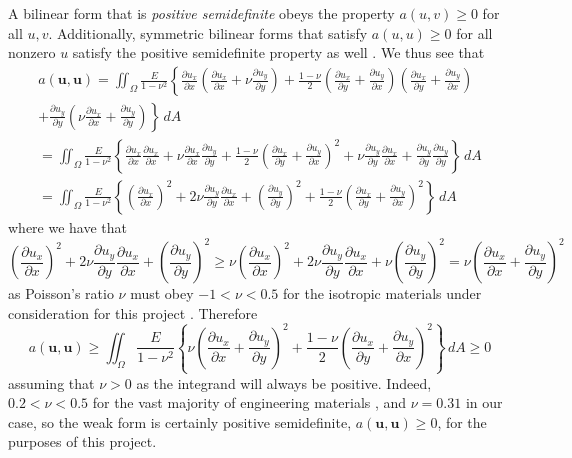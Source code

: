 \documentclass[11pt]{article}
\newcommand\p[2]{\frac{\partial #1}{\partial #2}}
\begin{document}
A bilinear form that is \emph{positive semidefinite} obeys the property $a(u,v) \ge 0$ for all $u,v$. Additionally, symmetric bilinear forms that satisfy $a(u,u) \ge 0$ for all nonzero $u$ satisfy the positive semidefinite property as well \cite{mathworld}. We thus see that
\begin{multline}
  a(\bm{u,u}) =
  \iint_\Omega \frac{E}{1-\nu^2} \left\{
    \p{u_x}{x} \left( \p{u_x}{x} + \nu\p{u_y}{y} \right)
      + \frac{1-\nu}{2} \left( \p{u_x}{y} + \p{u_y}{x} \right)
      \left( \p{u_x}{y} + \p{u_y}{x} \right) \right. \\ \left.
    + \p{u_y}{y} \left(\nu\p{u_x}{x} + \p{u_y}{y} \right)
  \right\} \, dA \\
  = \iint_\Omega \frac{E}{1-\nu^2} \left\{
  \p{u_x}{x} \p{u_x}{x} + \nu\p{u_x}{x}\p{u_y}{y}
  + \frac{1-\nu}{2} \left( \p{u_x}{y} + \p{u_y}{x} \right)^2 
  + \nu\p{u_y}{y}\p{u_x}{x} + \p{u_y}{y} \p{u_y}{y}
  \right\} \, dA \\
  = \iint_\Omega \frac{E}{1-\nu^2} \left\{
  \left( \p{u_x}{x} \right)^2 + 2\nu\p{u_y}{y}\p{u_x}{x} + \left( \p{u_y}{y} \right)^2
  + \frac{1-\nu}{2} \left( \p{u_x}{y} + \p{u_y}{x} \right)^2
  \right\} \, dA
\end{multline}
where we have that
\begin{equation*}
	\left( \p{u_x}{x} \right)^2 + 2\nu\p{u_y}{y}\p{u_x}{x} + \left( \p{u_y}{y} \right)^2
	\ge \nu \left( \p{u_x}{x} \right)^2 + 2\nu\p{u_y}{y}\p{u_x}{x} + \nu \left( \p{u_y}{y} \right)^2
	= \nu \left(  \p{u_x}{x} + \p{u_y}{y} \right)^2
\end{equation*}
as Poisson's ratio $\nu$ must obey $-1 < \nu < 0.5$ for the isotropic materials under consideration for this project \cite{Mott09}. Therefore
\begin{equation*}
	a(\bm{u,u})
	\ge \iint_\Omega \frac{E}{1-\nu^2} \left\{
		\nu \left(  \p{u_x}{x} + \p{u_y}{y} \right)^2
		+ \frac{1-\nu}{2} \left( \p{u_x}{y} + \p{u_y}{x} \right)^2
	\right\} \, dA
	\ge 0
\end{equation*}
assuming that $\nu > 0$ as the integrand will always be positive. Indeed, $0.2 < \nu < 0.5$ for the vast majority of engineering materials \cite{Mott09}, and $\nu = 0.31$ in our case, so the weak form is certainly positive semidefinite, $a(\bm{u,u}) \ge 0$, for the purposes of this project.
\end{document}
